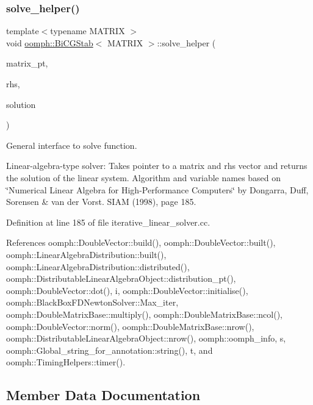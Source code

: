 \subsubsection{\texorpdfstring{solve\+\_\+helper()}{solve\_helper()}}
{\footnotesize\ttfamily template$<$typename M\+A\+T\+R\+IX $>$ \\
void \hyperlink{classoomph_1_1BiCGStab}{oomph\+::\+Bi\+C\+G\+Stab}$<$ M\+A\+T\+R\+IX $>$\+::solve\+\_\+helper (\begin{DoxyParamCaption}\item[{\hyperlink{classoomph_1_1DoubleMatrixBase}{Double\+Matrix\+Base} $\ast$const \&}]{matrix\+\_\+pt,  }\item[{const \hyperlink{classoomph_1_1DoubleVector}{Double\+Vector} \&}]{rhs,  }\item[{\hyperlink{classoomph_1_1DoubleVector}{Double\+Vector} \&}]{solution }\end{DoxyParamCaption})\hspace{0.3cm}{\ttfamily [private]}}



General interface to solve function. 

Linear-\/algebra-\/type solver\+: Takes pointer to a matrix and rhs vector and returns the solution of the linear system. Algorithm and variable names based on \char`\"{}\+Numerical Linear Algebra
for High-\/\+Performance Computers\char`\"{} by Dongarra, Duff, Sorensen \& van der Vorst. S\+I\+AM (1998), page 185. 

Definition at line 185 of file iterative\+\_\+linear\+\_\+solver.\+cc.



References oomph\+::\+Double\+Vector\+::build(), oomph\+::\+Double\+Vector\+::built(), oomph\+::\+Linear\+Algebra\+Distribution\+::built(), oomph\+::\+Linear\+Algebra\+Distribution\+::distributed(), oomph\+::\+Distributable\+Linear\+Algebra\+Object\+::distribution\+\_\+pt(), oomph\+::\+Double\+Vector\+::dot(), i, oomph\+::\+Double\+Vector\+::initialise(), oomph\+::\+Black\+Box\+F\+D\+Newton\+Solver\+::\+Max\+\_\+iter, oomph\+::\+Double\+Matrix\+Base\+::multiply(), oomph\+::\+Double\+Matrix\+Base\+::ncol(), oomph\+::\+Double\+Vector\+::norm(), oomph\+::\+Double\+Matrix\+Base\+::nrow(), oomph\+::\+Distributable\+Linear\+Algebra\+Object\+::nrow(), oomph\+::oomph\+\_\+info, s, oomph\+::\+Global\+\_\+string\+\_\+for\+\_\+annotation\+::string(), t, and oomph\+::\+Timing\+Helpers\+::timer().



\subsection{Member Data Documentation}
\mbox{\label{classoomph_1_1BiCGStab_a6f7e515c8dd64b1f3cc65e021abcbdca}} 

